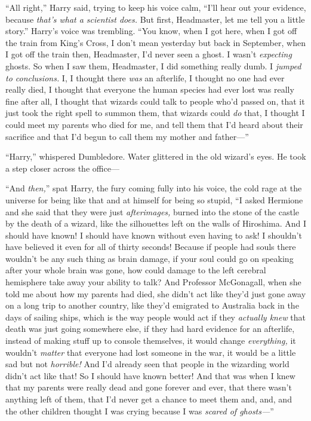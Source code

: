 “All right,” Harry said, trying to keep his voice calm, “I’ll hear out your evidence, because \emph{that’s what a scientist does.} But first, Headmaster, let me tell you a little story.” Harry’s voice was trembling. “You know, when I got here, when I got off the train from King’s Cross, I don’t mean yesterday but back in September, when I got off the train then, Headmaster, I’d never seen a ghost. I wasn’t \emph{expecting} ghosts. So when I saw them, Headmaster, I did something really dumb. I \emph{jumped to conclusions.} I, I thought there \emph{was} an afterlife, I thought no one had ever really died, I thought that everyone the human species had ever lost was really fine after all, I thought that wizards could talk to people who’d passed on, that it just took the right spell to summon them, that wizards could \emph{do} that, I thought I could meet my parents who died for me, and tell them that I’d heard about their sacrifice and that I’d begun to call them my mother and father—”

“Harry,” whispered Dumbledore. Water glittered in the old wizard’s eyes. He took a step closer across the office—

“And \emph{then,}” spat Harry, the fury coming fully into his voice, the cold rage at the universe for being like that and at himself for being so stupid, “I asked Hermione and she said that they were just \emph{afterimages,} burned into the stone of the castle by the death of a wizard, like the silhouettes left on the walls of Hiroshima. And I should have known! I should have known without even having to ask! I shouldn’t have believed it even for all of thirty seconds! Because if people had souls there wouldn’t be any such thing as brain damage, if your soul could go on speaking after your whole brain was gone, how could damage to the left cerebral hemisphere take away your ability to talk? And Professor McGonagall, when she told me about how my parents had died, she didn’t act like they’d just gone away on a long trip to another country, like they’d emigrated to Australia back in the days of sailing ships, which is the way people would act if they \emph{actually knew} that death was just going somewhere else, if they had hard evidence for an afterlife, instead of making stuff up to console themselves, it would change \emph{everything,} it wouldn’t \emph{matter} that everyone had lost someone in the war, it would be a little sad but not \emph{horrible!} And I’d already seen that people in the wizarding world didn’t act like that! So I should have known better! And that was when I knew that my parents were really dead and gone forever and ever, that there wasn’t anything left of them, that I’d never get a chance to meet them and, and, and the other children thought I was crying because I was \emph{scared of ghosts—}”

